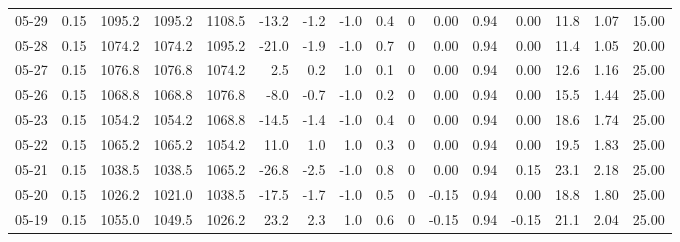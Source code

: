 \begin{threeparttable}
{\begin{tabular}{lrrrrrrrrrrrrrrr}
  05-29 &     0.15 & 1095.2 & 1095.2 & 1108.5 &      -13.2 &           -1.2 &                     -1.0 &                 0.4 &              0 &       0.00 &      0.94 &           0.00 &             11.8 &            1.07 &                  15.00 \\
  05-28 &     0.15 & 1074.2 & 1074.2 & 1095.2 &      -21.0 &           -1.9 &                     -1.0 &                 0.7 &              0 &       0.00 &      0.94 &           0.00 &             11.4 &            1.05 &                  20.00 \\
  05-27 &     0.15 & 1076.8 & 1076.8 & 1074.2 &        2.5 &            0.2 &                      1.0 &                 0.1 &              0 &       0.00 &      0.94 &           0.00 &             12.6 &            1.16 &                  25.00 \\
  05-26 &     0.15 & 1068.8 & 1068.8 & 1076.8 &       -8.0 &           -0.7 &                     -1.0 &                 0.2 &              0 &       0.00 &      0.94 &           0.00 &             15.5 &            1.44 &                  25.00 \\
  05-23 &     0.15 & 1054.2 & 1054.2 & 1068.8 &      -14.5 &           -1.4 &                     -1.0 &                 0.4 &              0 &       0.00 &      0.94 &           0.00 &             18.6 &            1.74 &                  25.00 \\
  05-22 &     0.15 & 1065.2 & 1065.2 & 1054.2 &       11.0 &            1.0 &                      1.0 &                 0.3 &              0 &       0.00 &      0.94 &           0.00 &             19.5 &            1.83 &                  25.00 \\
  05-21 &     0.15 & 1038.5 & 1038.5 & 1065.2 &      -26.8 &           -2.5 &                     -1.0 &                 0.8 &              0 &       0.00 &      0.94 &           0.15 &             23.1 &            2.18 &                  25.00 \\
  05-20 &     0.15 & 1026.2 & 1021.0 & 1038.5 &      -17.5 &           -1.7 &                     -1.0 &                 0.5 &              0 &      -0.15 &      0.94 &           0.00 &             18.8 &            1.80 &                  25.00 \\
  05-19 &     0.15 & 1055.0 & 1049.5 & 1026.2 &       23.2 &            2.3 &                      1.0 &                 0.6 &              0 &      -0.15 &      0.94 &          -0.15 &             21.1 &            2.04 &                  25.00 \\

\end{tabular}}
\end{threeparttable}
